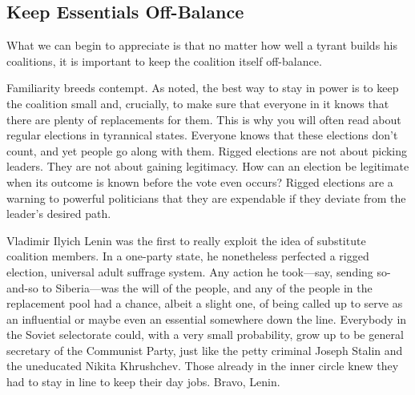 \documentclass[10pt]{article}
\begin{document}
\subsection{Keep Essentials Off-Balance}

{\large  What we can begin to appreciate is that no matter how well a tyrant
builds his coalitions, it is important to keep the coalition itself off-balance.}

{\large Familiarity breeds contempt. As noted, the best way to stay in power is
to keep the coalition small and, crucially, to make sure that everyone in it
knows that there are plenty of replacements for them. This is why you will often
read about regular elections in tyrannical states. Everyone knows that these
elections don't count, and yet people go along with them. Rigged elections are
not about picking leaders. They are not about gaining legitimacy. How can an
election be legitimate when its outcome is known before the vote even occurs?
Rigged elections are a warning to powerful politicians that they are expendable
if they deviate from the leader's desired path.}

{\large Vladimir Ilyich Lenin was the first to really exploit the idea of
substitute coalition members. In a one-party state, he nonetheless perfected a
rigged election, universal adult suffrage system. Any action he took---say,
sending so-and-so to Siberia---was the will of the people, and any of the people
in the replacement pool had a chance, albeit a slight one, of being called up to
serve as an influential or maybe even an essential somewhere down the line.
Everybody in the Soviet selectorate could, with a very small probability, grow up
to be general secretary of the Communist Party, just like the petty criminal
Joseph Stalin and the uneducated Nikita Khrushchev. Those already in the inner
circle knew they had to stay in line to keep their day jobs. Bravo, Lenin.}
\end{document}
